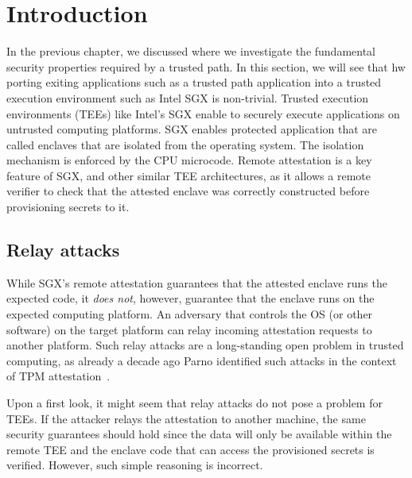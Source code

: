 \section{Introduction}
\label{sec:intro}


In the previous chapter, we discussed \protection where we investigate the fundamental security properties required by a trusted path. In this section, we will see that hw porting exiting applications such as a trusted path application into a trusted execution environment such as Intel SGX is non-trivial. Trusted execution environments (TEEs) like Intel's SGX enable to securely execute applications on untrusted computing platforms. SGX enables protected application that are called enclaves that are isolated from the operating system. The isolation mechanism is enforced by the CPU microcode. Remote attestation is a key feature of SGX, and other similar TEE architectures, as it allows a remote verifier to check that the attested enclave was correctly constructed before provisioning secrets to it. 


\subsection{Relay attacks}  While SGX's remote attestation guarantees that the attested enclave runs the expected code, it \emph{does not}, however,  guarantee that the enclave runs on the expected computing platform. An adversary that controls the OS (or other software) on the target platform can relay incoming attestation requests to another platform. Such relay attacks are a long-standing open problem in trusted computing, as already a decade ago Parno identified such attacks in the context of TPM attestation~\cite{parno2008bootstrapping}.


Upon a first look, it might seem that relay attacks do not pose a problem for TEEs. If the attacker relays the attestation to another machine, the same security guarantees should hold since the data will only be available within the remote TEE and the enclave code that can access the provisioned secrets is verified. However, such simple reasoning is incorrect. 

